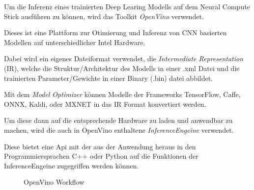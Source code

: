 Um die Inferenz eines trainierten Deep Learing Modells auf dem
Neural Compute Stick ausführen zu können, wird das Toolkit 
\textit{OpenVino} verwendet.

Dieses ist eine Plattform zur Otimierung und Inferenz von 
CNN basierten Modellen auf unterschiedlicher Intel Hardware.





Dabei wird ein eigenes Dateiformat verwendet, die \textit{Intermediate 
Representation} (IR), welche die Struktur/Architektur des Modells 
in einer .xml Datei und die trainierten Parameter/Gewichte in 
einer Binary (.bin) datei abbildet.

Mit dem \textit{Model Optimizer} können Modelle der Frameworks 
TensorFlow, Caffe, ONNX, Kaldi, oder MXNET in das IR Format 
konvertiert werden.

Um diese dann auf die entsprechende Hardware zu laden und anwendbar 
zu machen, wird die auch in OpenVino enthaltene
\textit{InferenceEngeine} verwendet.

Diese bietet eine Api mit der aus der Anwendung heraus in den 
Programmiersprachen C++ oder Python auf die Funktionen der 
InferenceEngeine zugegriffen werden können.



\begin{figure}[H]
    \centering
    \def\svgwidth{0.8\textwidth}
    
    \caption{OpenVino Workflow}
    \label{fig:openvinoflow}
\end{figure}



